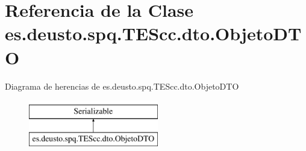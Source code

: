 \hypertarget{classes_1_1deusto_1_1spq_1_1_t_e_scc_1_1dto_1_1_objeto_d_t_o}{\section{Referencia de la Clase es.\+deusto.\+spq.\+T\+E\+Scc.\+dto.\+Objeto\+D\+T\+O}
\label{classes_1_1deusto_1_1spq_1_1_t_e_scc_1_1dto_1_1_objeto_d_t_o}
}
Diagrama de herencias de es.\+deusto.\+spq.\+T\+E\+Scc.\+dto.\+Objeto\+D\+T\+O\begin{figure}[H]
\begin{center}
\leavevmode
\includegraphics[height=2.000000cm]{classes_1_1deusto_1_1spq_1_1_t_e_scc_1_1dto_1_1_objeto_d_t_o}
\end{center}
\end{figure}
